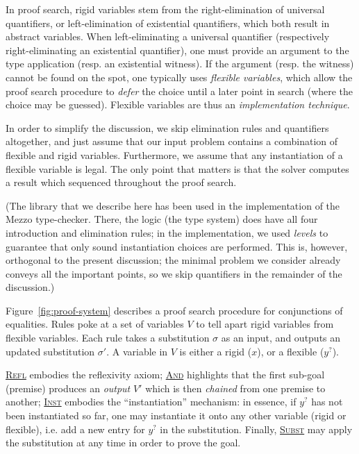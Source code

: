 \documentclass{easychair}
\let\TirName\textsc
\renewcommand{\DefTirName}[1]{\hyperlink{#1}{\TirName {#1}}}
\let\Rule\DefTirName
\newcommand{\fref}[1]{Figure~\ref{fig:#1}}
\newcommand{\f}[1]{\ensuremath{#1^?}} %
\begin{document}
In proof search, rigid variables stem from the right-elimination of universal
quantifiers, or left-elimination of existential quantifiers, which both result
in abstract variables. When left-eliminating a universal quantifier
(respectively right-eliminating an existential quantifier), one must provide an
argument to the type application (resp. an existential witness). If the argument
(resp. the witness) cannot be found on the spot, one typically uses
\emph{flexible variables}, which allow the proof search procedure to
\emph{defer} the choice until a later point in search (where the choice may be
guessed). Flexible variables are thus an \emph{implementation technique}.

In order to simplify the discussion, we skip elimination rules and quantifiers
altogether, and just assume that our input problem contains a combination of
flexible and rigid variables. Furthermore, we assume that any instantiation of a
flexible variable is legal. The only point that matters is that the solver
computes a result which sequenced throughout the proof search.

(The library that we describe here has been used in the implementation of the
Mezzo type-checker. There, the logic (the type system) does have all four
introduction and elimination rules; in the implementation, we used \emph{levels}
to guarantee that only sound instantiation choices are performed. This is,
however, orthogonal to the present discussion; the minimal problem we consider
already conveys all the important points, so we skip quantifiers in the
remainder of the discussion.)

\fref{proof-system} describes a proof search procedure for conjunctions of
equalities. Rules poke at a set of variables $V$ to tell apart rigid variables from
flexible variables. Each rule takes a substitution $\sigma$ as an input, and outputs
an updated substitution $\sigma'$. A variable in $V$ is either a rigid ($x$),
or a flexible ($\f y$).

\Rule{Refl} embodies the reflexivity axiom; \Rule{And}
highlights that the first sub-goal (premise) produces an \emph{output} $V'$
which is then \emph{chained}
from one premise to another; \Rule{Inst} embodies the ``instantiation''
mechanism: in essence, if $\f y$ has not been instantiated so far, one
may instantiate it onto any other variable (rigid or flexible), i.e. add a new
entry for $\f y$ in the substitution. Finally, \Rule{Subst} may apply the
substitution at any time in order to prove the goal.
\end{document}
